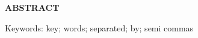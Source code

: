 \thispagestyle{empty}
\begin{center}
\textbf{\MakeUppercase{Abstract}}
\end{center}

\lipsum[6]

\vspace{1em}

Keywords: key; words; separated; by; semi commas
\newpage